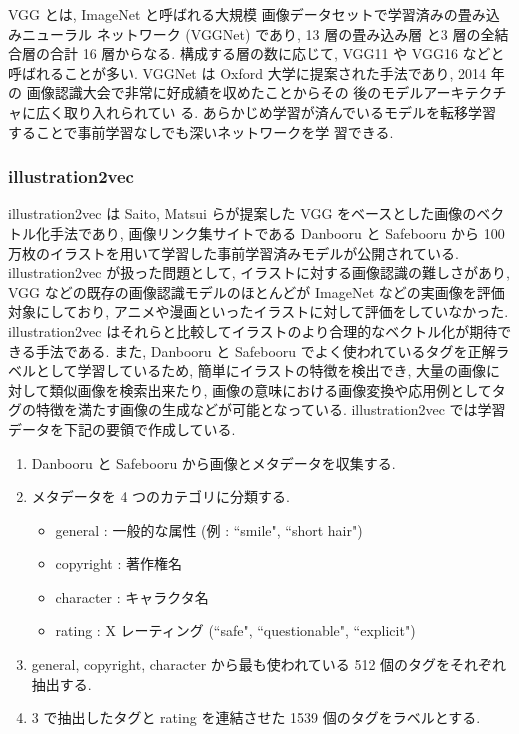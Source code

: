 VGG \cite{brusilovsky:simonyan2014very} とは, ImageNet と呼ばれる大規模
画像データセットで学習済みの畳み込みニューラル
ネットワーク (VGGNet) であり, 13 層の畳み込み層
と3 層の全結合層の合計 16 層からなる. 構成する層の数に応じて, VGG11 や VGG16 などと呼ばれることが多い. VGGNet は Oxford 大学に提案された手法であり, 2014 年の
画像認識大会で非常に好成績を収めたことからその
後のモデルアーキテクチャに広く取り入れられてい
る. あらかじめ学習が済んでいるモデルを転移学習
することで事前学習なしでも深いネットワークを学
習できる.

\changeindent{0cm}
\subsubsection{illustration2vec}
\changeindent{2cm}

illustration2vec \cite{i2v} は Saito, Matsui らが提案した VGG をベースとした画像のベクトル化手法であり, 画像リンク集サイトである Danbooru と Safebooru から 100 万枚のイラストを用いて学習した事前学習済みモデルが公開されている. illustration2vec が扱った問題として, イラストに対する画像認識の難しさがあり, VGG などの既存の画像認識モデルのほとんどが ImageNet \cite{imagenet_cvpr09} などの実画像を評価対象にしており, アニメや漫画といったイラストに対して評価をしていなかった. illustration2vec はそれらと比較してイラストのより合理的なベクトル化が期待できる手法である. また, Danbooru と Safebooru でよく使われているタグを正解ラベルとして学習しているため, 簡単にイラストの特徴を検出でき, 大量の画像に対して類似画像を検索出来たり, 画像の意味における画像変換や応用例としてタグの特徴を満たす画像の生成などが可能となっている.
\newpage
illustration2vec では学習データを下記の要領で作成している.

\begin{enumerate}
  \item Danbooru と Safebooru から画像とメタデータを収集する.
  \item メタデータを 4 つのカテゴリに分類する.
        \begin{itemize}
          \item general : 一般的な属性 (例 : ``smile", ``short hair")
          \item copyright : 著作権名
          \item character : キャラクタ名
          \item rating : X レーティング (``safe", ``questionable", ``explicit")
        \end{itemize}
  \item general, copyright, character から最も使われている 512 個のタグをそれぞれ抽出する.
  \item 3 で抽出したタグと rating を連結させた 1539 個のタグをラベルとする.
\end{enumerate}
